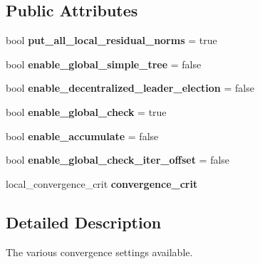 \subsection*{Public Attributes}
\begin{DoxyCompactItemize}
\item 
\mbox{\label{structschwz_1_1Settings_1_1convergence__settings_a7b59fc6a81840e480022b3b52622e210}} 
bool {\bfseries put\+\_\+all\+\_\+local\+\_\+residual\+\_\+norms} = true
\item 
\mbox{\label{structschwz_1_1Settings_1_1convergence__settings_a8d879ba6e688dac577fa9207e84b8b2e}} 
bool {\bfseries enable\+\_\+global\+\_\+simple\+\_\+tree} = false
\item 
\mbox{\label{structschwz_1_1Settings_1_1convergence__settings_a03bbb0657be2ef802a8dc872f554dfff}} 
bool {\bfseries enable\+\_\+decentralized\+\_\+leader\+\_\+election} = false
\item 
\mbox{\label{structschwz_1_1Settings_1_1convergence__settings_a7af173ab941404924afd9ab242c2d33e}} 
bool {\bfseries enable\+\_\+global\+\_\+check} = true
\item 
\mbox{\label{structschwz_1_1Settings_1_1convergence__settings_a4cdcdbceac3a2d54e739367af68ed4f8}} 
bool {\bfseries enable\+\_\+accumulate} = false
\item 
\mbox{\label{structschwz_1_1Settings_1_1convergence__settings_a44b98682421e746a40fd9fca109cb3b5}} 
bool {\bfseries enable\+\_\+global\+\_\+check\+\_\+iter\+\_\+offset} = false
\item 
local\+\_\+convergence\+\_\+crit {\bfseries convergence\+\_\+crit}
\end{DoxyCompactItemize}


\subsection{Detailed Description}
The various convergence settings available. 

